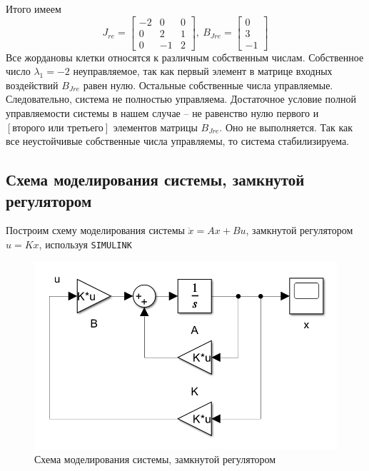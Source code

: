 \documentclass[a4paper, 12pt]{article}
\begin{document}
    Итого имеем
    $$
    J_{re}=\begin{bmatrix}
        -2     &0     &0\\
         0     &2     &1\\
         0    &-1     &2
        \end{bmatrix},\ B_{Jre}=\begin{bmatrix}
            0\\
         3\\
        -1
        \end{bmatrix}
    $$
    Все жордановы клетки относятся к различным собственным числам. Собственное число $\lambda_1=-2$ неуправляемое, так как первый элемент в матрице
    входных воздействий $B_{Jre}$ равен нулю. Остальные собственные числа управляемые.
    Следовательно, система не полностью управляема. Достаточное условие полной управляемости
    системы в нашем случае -- не равенство нулю первого и $\left[\text{второго или третьего}\right]$
    элементов матрицы $B_{Jre}$. Оно не выполняется. Так как все неустойчивые собственные числа
    управляемы, то система стабилизируема.


    \subsection{Схема моделирования системы, замкнутой регулятором}
    Построим схему моделирования системы $\dot{x}=Ax+Bu$, замкнутой регулятором $u=Kx$, используя \texttt{SIMULINK}
    \begin{figure}[H]
        \centering
        \includegraphics[scale=0.5]{scheme_task1.png}
        \captionsetup{skip=0pt}
        \caption{Схема моделирования системы, замкнутой регулятором}
        \label{fig:scheme_task1}
    \end{figure}
\end{document}
